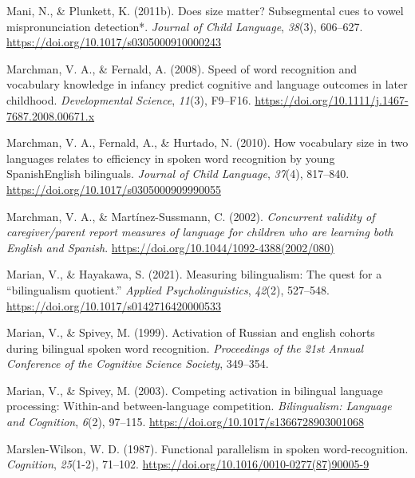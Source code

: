 \documentclass[
  12pt,
  b5paperpaper,
  twoside]{scrreprt}
\newlength{\cslhangindent}
\newlength{\cslentryspacingunit} %
\newenvironment{CSLReferences}[2] %
 {%
  \setlength{\parindent}{0pt}
  \ifodd #1
  \let\oldpar\par
  \def\par{\hangindent=\cslhangindent\oldpar}
  \fi
  \setlength{\parskip}{#2\cslentryspacingunit}
 }%
 {}
\begin{document}
\begin{CSLReferences}{1}{0}
\leavevmode{}%
Mani, N., \& Plunkett, K. (2011b). Does size matter? {Subsegmental} cues
to vowel mispronunciation detection*. \emph{Journal of Child Language},
\emph{38}(3), 606--627. \url{https://doi.org/10.1017/s0305000910000243}

\leavevmode{}%
Marchman, V. A., \& Fernald, A. (2008). Speed of word recognition and
vocabulary knowledge in infancy predict cognitive and language outcomes
in later childhood. \emph{Developmental Science}, \emph{11}(3), F9--F16.
\url{https://doi.org/10.1111/j.1467-7687.2008.00671.x}

\leavevmode{}%
Marchman, V. A., Fernald, A., \& Hurtado, N. (2010). How vocabulary size
in two languages relates to efficiency in spoken word recognition by
young {Spanish}{\textendash}{English} bilinguals. \emph{Journal of Child
Language}, \emph{37}(4), 817--840.
\url{https://doi.org/10.1017/s0305000909990055}

\leavevmode{}%
Marchman, V. A., \& Martínez-Sussmann, C. (2002). \emph{Concurrent
validity of caregiver/parent report measures of language for children
who are learning both {English} and {Spanish}}.
\url{https://doi.org/10.1044/1092-4388(2002/080)}

\leavevmode{}%
Marian, V., \& Hayakawa, S. (2021). Measuring bilingualism: The quest
for a {``bilingualism quotient.''} \emph{Applied Psycholinguistics},
\emph{42}(2), 527--548. \url{https://doi.org/10.1017/s0142716420000533}

\leavevmode{}%
Marian, V., \& Spivey, M. (1999). Activation of {Russian} and english
cohorts during bilingual spoken word recognition. \emph{Proceedings of
the 21st {Annual Conference} of the {Cognitive Science Society}},
349--354.

\leavevmode{}%
Marian, V., \& Spivey, M. (2003). Competing activation in bilingual
language processing: Within-and between-language competition.
\emph{Bilingualism: Language and Cognition}, \emph{6}(2), 97--115.
\url{https://doi.org/10.1017/s1366728903001068}

\leavevmode{}%
Marslen-Wilson, W. D. (1987). Functional parallelism in spoken
word-recognition. \emph{Cognition}, \emph{25}(1-2), 71--102.
\url{https://doi.org/10.1016/0010-0277(87)90005-9}


\end{CSLReferences}
\end{document}
